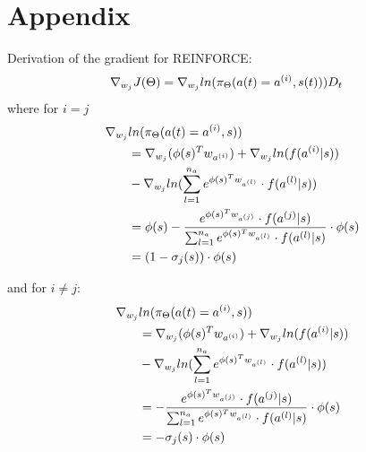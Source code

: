\documentclass[journal, a4paper]{IEEEtran}
\theoremstyle{plain}
\theoremstyle{definition}
\begin{document}
\section{Appendix}
Derivation of the gradient for REINFORCE:
\begin{equation}
\begin{split}
	\nabla_{w_j}J(\Theta) & = 
\nabla_{w_j} ln(\pi_\Theta(a(t) = a^{(i)},s(t)))D_t
\notag
\end{split}
\end{equation}
where for $i = j$ 
\begin{equation}
\begin{split}
\nabla_{w_j} & ln(  \pi_\Theta(a(t)= a^{(i)},s)) \\
 &=\nabla_{w_j} (\phi(s)^T w_{a^{(i)}}) + \nabla_{w_j} ln(f(a^{(i)}|s))
\notag
\\
 & - 
\nabla_{w_j} ln(\sum_{l=1}^{n_a} e^{\phi(s)^T w_{a^{(l)}}}\cdot f(a^{(l)}|s))
\notag
\\
& =
\phi(s) - \frac{ e^{\phi(s)^T w_{a^{(j)}}} \cdot f(a^{(j)}|s)}{\sum_{l=1}^{n_a} e^{\phi(s)^T w_{a^{(l)}}}\cdot f(a^{(l)}|s)} \cdot \phi(s)
\notag
\\
&=(1-\sigma_j(s))\cdot \phi(s)
\end{split}
\end{equation}

and for $i \neq j$:
\begin{equation}
\begin{split}
\nabla_{w_j} & ln(\pi_\Theta(a(t) = a^{(i)},s))
\\ 
 & =\nabla_{w_j} (\phi(s)^T w_{a^{(i)}}) + \nabla_{w_j} ln(f(a^{(i)}|s))
\\
 & - 
\nabla_{w_j} ln(\sum_{l=1}^{n_a} e^{\phi(s)^T w_{a^{(l)}}}\cdot f(a^{(l)}|s))
\\
&=- \frac{ e^{\phi(s)^T w_{a^{(j)}}} \cdot f(a^{(j)}|s)}{\sum_{l=1}^{n_a} e^{\phi(s)^T w_{a^{(l)}}}\cdot f(a^{(l)}|s)} \cdot \phi(s)
\\
& =-\sigma_j(s)\cdot \phi(s)
\notag
\end{split}
\end{equation}
\end{document}
